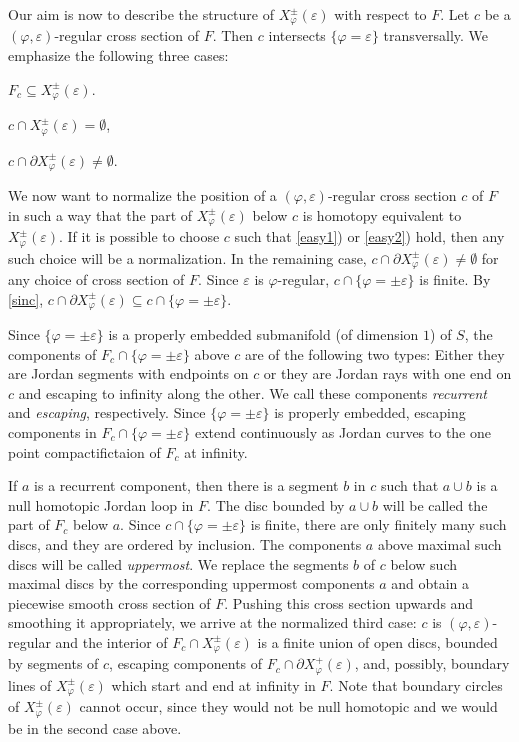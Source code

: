 Our aim is now to describe the structure of $X_{\varphi}^\pm({\varepsilon})$ with respect to $F$.
Let $c$ be a $({\varphi},{\varepsilon})$-regular cross section of $F$.
Then $c$ intersects $\{{\varphi}={\varepsilon}\}$ transversally.
We emphasize the following three cases:
\begin{compactenum}[1)]
\item\label{easy1}
$F_c\subseteq X_{\varphi}^\pm({\varepsilon})$.
\item\label{easy2}
$c\cap X_{\varphi}^\pm({\varepsilon})=\emptyset$,
\item\label{strips}
$c\cap\partial X_{\varphi}^\pm({\varepsilon})\ne\emptyset$.
\end{compactenum}
We now want to normalize the position of a $({\varphi},{\varepsilon})$-regular cross section $c$ of $F$
in such a way that the part of $X_{\varphi}^\pm({\varepsilon})$ below $c$
is homotopy equivalent to $X_{\varphi}^\pm({\varepsilon})$.
If it is possible to choose $c$ such that \ref{easy1}) or \ref{easy2}) hold,
then any such choice will be a normalization.
In the remaining case, $c\cap\partial X_{\varphi}^\pm({\varepsilon})\ne\emptyset$
for any choice of cross section of $F$.
Since ${\varepsilon}$ is ${\varphi}$-regular, $c\cap\{{\varphi}=\pm {\varepsilon}\}$ is finite.
By \cref{sinc}, $c\cap\partial X_{\varphi}^\pm({\varepsilon})\subseteq c\cap\{{\varphi}=\pm {\varepsilon}\}$.

Since $\{{\varphi}=\pm{\varepsilon}\}$ is a properly embedded submanifold (of dimension $1$) of $S$,
the components of $F_c\cap\{{\varphi}=\pm{\varepsilon}\}$ above $c$ are of the following two types:
Either they are Jordan segments with endpoints on $c$ or they are Jordan rays with
one end on $c$ and escaping to infinity along the other.
We call these components \emph{recurrent} and \emph{escaping}, respectively.
Since $\{{\varphi}=\pm{\varepsilon}\}$ is properly embedded, escaping components in $F_c\cap\{{\varphi}=\pm{\varepsilon}\}$ 
extend continuously as Jordan curves to the one point compactifictaion of $F_c$ at infinity.

If $a$ is a recurrent component, then there is a segment $b$ in $c$ such that
$a\cup b$ is a null homotopic Jordan loop in $F$.
The disc bounded by $a\cup b$ will be called the part of $F_c$ below $a$.
Since $c\cap\{{\varphi}=\pm{\varepsilon}\}$ is finite, there are only finitely many such discs,
and they are ordered by inclusion.
The components $a$ above maximal such discs will be called \emph{uppermost}.
We replace the segments $b$ of $c$ below such maximal discs by the
corresponding uppermost components $a$
and obtain a piecewise smooth cross section of $F$.
Pushing this cross section upwards and smoothing it appropriately,
we arrive at the normalized third case:
$c$ is $({\varphi},{\varepsilon})$-regular and the interior of $F_c\cap X_{\varphi}^\pm({\varepsilon})$
is a finite union of open discs,
bounded by segments of $c$, escaping components of $F_c\cap \partial X_{\varphi}^+({\varepsilon})$,
and, possibly, boundary lines of $X_{\varphi}^\pm({\varepsilon})$
which start and end at infinity in $F$.
Note that boundary circles of $X_{\varphi}^\pm({\varepsilon})$ cannot occur,
since they would not be null homotopic and we would be in the second case above.

